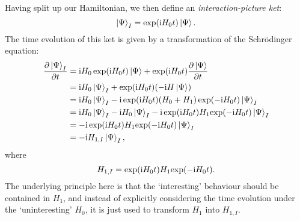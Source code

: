 Having split up our Hamiltonian, we then define an \textit{interaction-picture ket}:
\begin{equation}
    \label{eq:interaction_state}
    \ket{\Psi}_I = \exp(\mathrm{i} H_0 t)\ket{\Psi}.
\end{equation}
The time evolution of this ket is given by a transformation of the Schr\"odinger equation:
\begin{align}
    \label{eq:interaction_evolution}
    \frac{\partial\ket{\Psi}_I}{\partial t} &= \mathrm{i} H_0 \exp(\mathrm{i} H_0 t) \ket{\Psi} + \exp(\mathrm{i} H_0 t)\frac{\partial \ket{\Psi}}{\partial t} \notag \\
                                            &= \mathrm{i} H_0 \ket{\Psi}_I + \exp(\mathrm{i} H_0 t) (-\mathrm{i} H\ket{\Psi}) \notag \\
                                            &= \mathrm{i} H_0 \ket{\Psi}_I - \mathrm{i}\exp(\mathrm{i} H_0t)(H_0 + H_1)\exp(-\mathrm{i} H_0 t)\ket{\Psi}_I \notag \\
                                            &= \mathrm{i} H_0 \ket{\Psi}_I - \mathrm{i} H_0\ket{\Psi}_I - \mathrm{i}\exp(\mathrm{i} H_0t)H_1\!\exp(-\mathrm{i} H_0 t)\ket{\Psi}_I \notag \\
                                            &= -\mathrm{i}\exp(\mathrm{i} H_0 t)H_1\!\exp(-\mathrm{i} H_0 t)\ket{\Psi}_I \notag \\
                                            &= -\mathrm{i} H_{1,I}\ket{\Psi}_I,
\end{align}
where
\begin{equation}
    \label{eq:interaction_h1i}
    H_{1,I} = \exp(\mathrm{i} H_0 t) H_1 \!\exp(-\mathrm{i} H_0 t).
\end{equation}
The underlying principle here is that the `interesting' behaviour should be contained in $H_1$, and instead of explicitly considering the time evolution under the `uninteresting' $H_0$, it is just used to transform $H_1$ into $H_{1,I}$.

